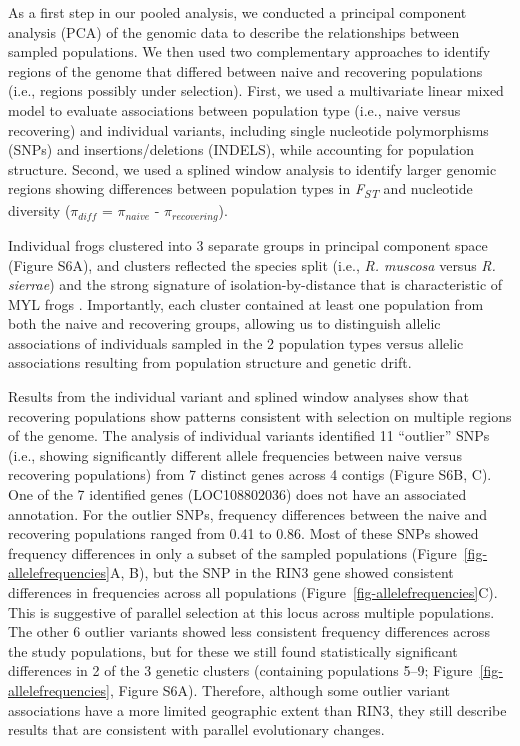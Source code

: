 \documentclass[9pt,twocolumn,twoside,lineno]{pnas-new}
\begin{document}
As a first step in our pooled analysis, we conducted a principal
component analysis (PCA) of the genomic data to describe the
relationships between sampled populations. We then used two
complementary approaches to identify regions of the genome that differed
between naive and recovering populations (i.e., regions possibly under
selection). First, we used a multivariate linear mixed model to evaluate
associations between population type (i.e., naive versus recovering) and
individual variants, including single nucleotide polymorphisms (SNPs)
and insertions/deletions (INDELS), while accounting for population
structure. Second, we used a splined window analysis to identify larger
genomic regions showing differences between population types in
\emph{F\textsubscript{ST}} and nucleotide diversity (\(\pi_{diff}\) =
\(\pi_{naive}\) - \(\pi_{recovering}\)).

Individual frogs clustered into 3 separate groups in principal component
space (Figure S6A), and clusters reflected
the species split (i.e., \emph{R. muscosa} versus \emph{R. sierrae}) and
the strong signature of isolation-by-distance that is characteristic of
MYL frogs \citep{rothstein2020, poorten2017, byrne2023}. Importantly,
each cluster contained at least one population from both the naive and
recovering groups, allowing us to distinguish allelic associations of
individuals sampled in the 2 population types versus allelic
associations resulting from population structure and genetic drift.

Results from the individual variant and splined window analyses show
that recovering populations show patterns consistent with selection on
multiple regions of the genome. The analysis of individual variants
identified 11 ``outlier'' SNPs (i.e., showing significantly different
allele frequencies between naive versus recovering populations) from 7
distinct genes across 4 contigs (Figure S6B, C). One of the 7 identified genes (LOC108802036) does not have an
associated annotation. For the outlier SNPs, frequency differences
between the naive and recovering populations ranged from 0.41 to 0.86.
Most of these SNPs showed frequency differences in only a subset of the
sampled populations (Figure~\ref{fig-allelefrequencies}A, B), but the
SNP in the RIN3 gene showed consistent differences in frequencies across
all populations (Figure~\ref{fig-allelefrequencies}C). This is
suggestive of parallel selection at this locus across multiple
populations. The other 6 outlier variants showed less consistent
frequency differences across the study populations, but for these we
still found statistically significant differences in 2 of the 3 genetic
clusters (containing populations 5--9;
Figure~\ref{fig-allelefrequencies}, Figure S6A). Therefore, although some outlier variant associations have a more
limited geographic extent than RIN3, they still describe results that
are consistent with parallel evolutionary changes.
\end{document}
